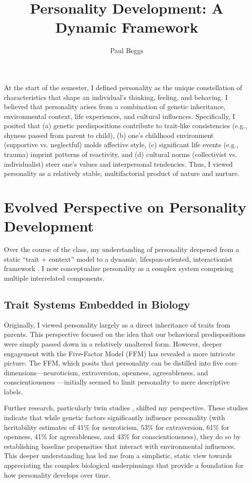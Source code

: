 \documentclass[stu]{apa7}
\title{Personality Development: A Dynamic Framework}
\author{Paul Beggs}
\begin{document}
\maketitle

At the start of the semester, I defined personality as the unique constellation of characteristics that shape an individual's thinking, feeling, and behaving. I believed that personality arises from a combination of genetic inheritance, environmental context, life experiences, and cultural influences. Specifically, I posited that (a) genetic predispositions contribute to trait-like consistencies (e.g., shyness passed from parent to child), (b) one's childhood environment (supportive vs. neglectful) molds affective style, (c) significant life events (e.g., trauma) imprint patterns of reactivity, and (d) cultural norms (collectivist vs. individualist) steer one's values and interpersonal tendencies. Thus, I viewed personality as a relatively stable, multifactorial product of nature and nurture.

\section{Evolved Perspective on Personality Development}

Over the course of the class, my understanding of personality deepened from a static ``trait + context'' model to a dynamic, lifespan-oriented, interactionist framework \parencite{burger2018personality}. I now conceptualize personality as a complex system comprising multiple interrelated components.

\subsection{Trait Systems Embedded in Biology}

Originally, I viewed personality largely as a direct inheritance of traits from parents. This perspective focused on the idea that our behavioral predispositions were simply passed down in a relatively unaltered form. However, deeper engagement with the Five-Factor Model (FFM) has revealed a more intricate picture. The FFM, which posits that personality can be distilled into five core dimensions—neuroticism, extraversion, openness, agreeableness, and conscientiousness \parencite{goldberg1990alternative}—initially seemed to limit personality to mere descriptive labels.

Further research, particularly twin studies \parencite{jang1996heritability}, shifted my perspective. These studies indicate that while genetic factors significantly influence personality (with heritability estimates of 41\% for neuroticism, 53\% for extraversion, 61\% for openness, 41\% for agreeableness, and 43\% for conscientiousness), they do so by establishing baseline propensities that interact with environmental influences. This deeper understanding has led me from a simplistic, static view towards appreciating the complex biological underpinnings that provide a foundation for how personality develops over time.
\end{document}

